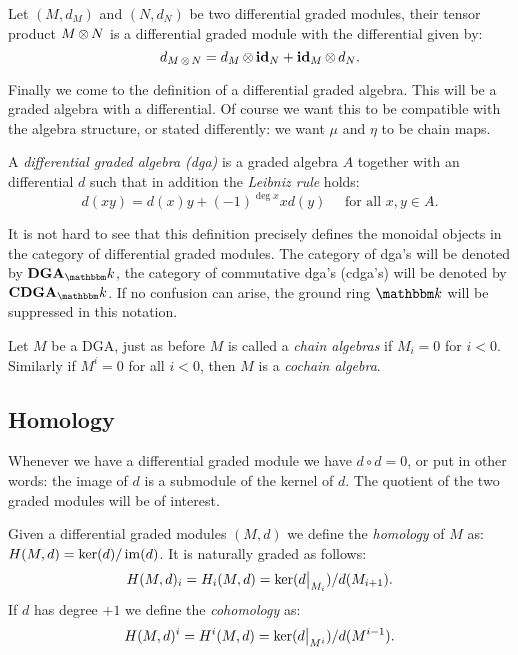 \begin{definition}
	Let $(M, d_M)$ and $(N, d_N)$ be two differential graded modules, their tensor product $M \operatorname*{\otimes} N$ is a differential graded module with the differential given by:
	$$ d_{M \operatorname*{\otimes} N} = d_M \operatorname*{\otimes} \mathbf{id}_N + \mathbf{id}_M \operatorname*{\otimes} d_N. $$
\end{definition}

Finally we come to the definition of a differential graded algebra. This will be a graded algebra with a differential. Of course we want this to be compatible with the algebra structure, or stated differently: we want $\mu$ and $\eta$ to be chain maps.

\begin{definition}
	A \emph{differential graded algebra (dga)} is a graded algebra $A$ together with an differential $d$ such that in addition the \emph{Leibniz rule} holds:
	$$ d(x y) = d(x) y + (-1)^{\deg{x}} x d(y) \quad\text{ for all } x, y \in A. $$
\end{definition}


It is not hard to see that this definition precisely defines the monoidal objects in the category of differential graded modules. The category of dga's will be denoted by $\DGA_\k$, the category of commutative dga's (cdga's) will be denoted by $\CDGA_\k$. If no confusion can arise, the ground ring $\k$ will be suppressed in this notation.

Let $M$ be a DGA, just as before $M$ is called a \emph{chain algebras} if $M_i = 0$ for $i < 0$. Similarly if $M^i = 0$ for all $i < 0$, then $M$ is a \emph{cochain algebra}.



\subsection{Homology}

Whenever we have a differential graded module we have $d \circ d = 0$, or put in other words: the image of $d$ is a submodule of the kernel of $d$. The quotient of the two graded modules will be of interest.

\begin{definition}
	Given a differential graded modules $(M, d)$ we define the \emph{homology} of $M$ as: $H(M, d) = \ker(d) / \operatorname*{im}(d)$.
	It is naturally graded as follows:
	$$ H(M, d)_i = H_i(M, d) = \ker(\restr{d}{M_i}) / d(M_{i+1}). $$
	If $d$ has degree $+1$ we define the \emph{cohomology} as:
	$$ H(M, d)^i = H^i(M, d) = \ker(\restr{d}{M^i}) / d(M^{i-1}). $$
\end{definition}

